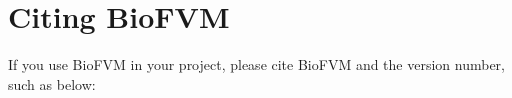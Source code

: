 \documentclass[11pt]{article}
\begin{document}
%
%
%



\section{Citing BioFVM}
If you use BioFVM in your project, please cite BioFVM and the version  number, such as below:\\
\end{document}
